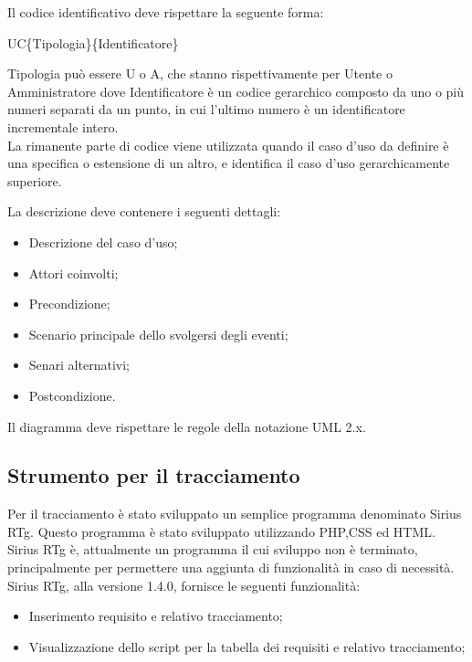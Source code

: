 \begin{flushleft}
Il codice identificativo deve rispettare la seguente forma:
\end{flushleft}

\begin{center}UC\{Tipologia\}\{Identificatore\}\end{center}
Tipologia può essere U o A, che stanno rispettivamente per Utente o Amministratore
dove Identificatore è un codice gerarchico composto da uno o più numeri separati da un punto, in cui l'ultimo numero è un identificatore incrementale intero.\\
La rimanente parte di codice viene utilizzata quando il caso d'uso da definire è una specifica o estensione di un altro, e identifica il caso d'uso gerarchicamente superiore.

\begin{flushleft}
La descrizione deve contenere i seguenti dettagli:
\end{flushleft}

\begin{itemize}
\item Descrizione del caso d'uso;
\item Attori coinvolti;
\item Precondizione;
\item Scenario principale dello svolgersi degli eventi;
\item Senari alternativi;
\item Postcondizione.
\end{itemize}

\begin{flushleft}
Il diagramma deve rispettare le regole della notazione UML 2.x.
\end{flushleft}
\subsection{Strumento per il tracciamento}
Per il tracciamento è stato sviluppato un semplice programma denominato Sirius RTg. Questo programma è stato sviluppato utilizzando PHP,CSS ed HTML. Sirius RTg è, attualmente un programma il cui sviluppo non è terminato, principalmente per permettere una aggiunta di funzionalità in caso di necessità. Sirius RTg, alla versione 1.4.0, fornisce le seguenti funzionalità:
\begin{itemize}
\item Inserimento requisito e relativo tracciamento;
\item Visualizzazione dello script per la tabella dei requisiti e relativo tracciamento;
\end{itemize}
